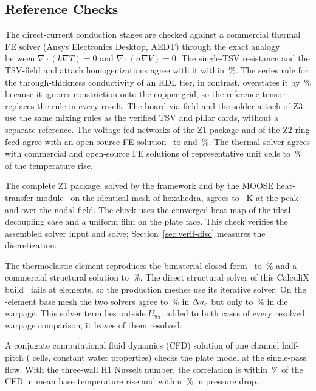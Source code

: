 \subsection{Reference Checks}
The direct-current conduction stages are checked against a commercial thermal FE solver (Ansys
Electronics Desktop, AEDT) through the exact analogy between $\nabla\!\cdot(k\nabla T) = 0$ and $\nabla\!\cdot(\sigma\nabla V) = 0$.
The single-TSV resistance and the TSV-field and attach homogenizations agree with it within
\ErrHomogMax\,\%. The series rule for the through-thickness conductivity of an RDL tier, in
contrast, overstates it by \ErrRdlKz\,\% because it ignores constriction onto the copper grid, so
the reference tensor replaces the rule in every result. The board via field and the solder attach
of Z3 use the same mixing rules as the verified TSV and pillar cards, without a separate
reference. The voltage-fed networks of the Z1 package and of the Z2 ring feed agree with an
open-source FE solution~\cite{MOOSE} to \ErrPkgRdlZone{} and \MthErrRingNet\,\%. The thermal solver
agrees with commercial and open-source FE solutions of representative unit cells to
\ErrThermMax\,\% of the temperature rise.

The complete Z1 package, solved by the framework and by the MOOSE heat-transfer
module~\cite{MOOSE} on the identical mesh of \MthFpElems{} hexahedra, agrees to
\FullPkgErrZone~K at the peak and over the nodal field. The check uses the converged heat map
of the ideal-decoupling case and a uniform film on the plate face. This check verifies the
assembled solver input and solve; Section~\ref{sec:verif-disc} measures the discretization.

The thermoelastic element reproduces the bimaterial closed form~\cite{Timoshenko1925} to
\ErrMechClosed\,\% and a commercial structural solution to \ErrMechAedt\,\%. The direct
structural solver of this CalculiX build~\cite{CalculiX} fails at \MthSolverFailElems{} elements,
so the production meshes use its iterative solver. On the \MthSolverElems-element base mesh the
two solvers agree to \MthSolverDu\,\% in $\Delta u_{\mathrm{c}}$ but only to \MthSolverWarp\,\% in die warpage.
This solver term lies outside $U_{95}$; added to both cases of every resolved warpage comparison,
it leaves \MthSolverHold{} of them resolved.

A conjugate computational fluid dynamics (CFD) solution of one channel half-pitch
(\MthCfdCells{} cells, constant water properties) checks the plate model at the single-pass flow.
With the three-wall H1 Nusselt number, the correlation is within \MthCfdErr\,\% of the CFD in mean
base temperature rise and within \MthCfdDpErr\,\% in pressure drop.

